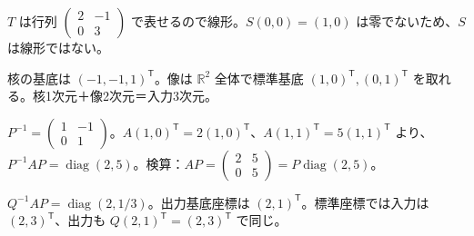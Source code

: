\documentclass[11pt]{article}
\begin{document}

\problem[線形性]
\begin{ans}
$T$ は行列 $\begin{pmatrix}2&-1\\0&3\end{pmatrix}$ で表せるので線形。$S(0,0)=(1,0)$ は零でないため、$S$ は線形ではない。
\end{ans}

\problem[核と像]
\begin{ans}
核の基底は $(-1,-1,1)^{\mathsf T}$。像は $\mathbb R^2$ 全体で標準基底 $(1,0)^{\mathsf T},(0,1)^{\mathsf T}$ を取れる。核1次元＋像2次元＝入力3次元。
\end{ans}
\newpage

\problem[同じ基底での表現]
\begin{ans}
$P^{-1}=\begin{pmatrix}1&-1\\0&1\end{pmatrix}$。$A(1,0)^{\mathsf T}=2(1,0)^{\mathsf T}$、$A(1,1)^{\mathsf T}=5(1,1)^{\mathsf T}$ より、$P^{-1}AP=\operatorname{diag}(2,5)$。検算：$AP=\begin{pmatrix}2&5\\0&5\end{pmatrix}=P\operatorname{diag}(2,5)$。
\end{ans}

\problem[異なる基底]
\begin{ans}
$Q^{-1}AP=\operatorname{diag}(2,1/3)$。出力基底座標は $(2,1)^{\mathsf T}$。標準座標では入力は $(2,3)^{\mathsf T}$、出力も $Q(2,1)^{\mathsf T}=(2,3)^{\mathsf T}$ で同じ。
\end{ans}
\end{document}
